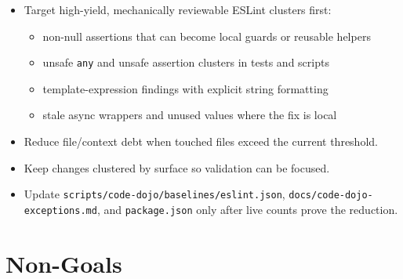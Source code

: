 \begin{itemize}
\tightlist
\item
  Target high-yield, mechanically reviewable ESLint clusters first:

  \begin{itemize}
  \tightlist
  \item
    non-null assertions that can become local guards or reusable helpers
  \item
    unsafe \texttt{a\allowbreak{}n\allowbreak{}y} and unsafe assertion clusters in tests and scripts
  \item
    template-expression findings with explicit string formatting
  \item
    stale async wrappers and unused values where the fix is local
  \end{itemize}
\item
  Reduce file/context debt when touched files exceed the current threshold.
\item
  Keep changes clustered by surface so validation can be focused.
\item
  Update \texttt{s\allowbreak{}c\allowbreak{}r\allowbreak{}i\allowbreak{}p\allowbreak{}t\allowbreak{}s\allowbreak{}/\allowbreak{}c\allowbreak{}o\allowbreak{}d\allowbreak{}e\allowbreak{}-\allowbreak{}d\allowbreak{}o\allowbreak{}j\allowbreak{}o\allowbreak{}/\allowbreak{}b\allowbreak{}a\allowbreak{}s\allowbreak{}e\allowbreak{}l\allowbreak{}i\allowbreak{}n\allowbreak{}e\allowbreak{}s\allowbreak{}/\allowbreak{}e\allowbreak{}s\allowbreak{}l\allowbreak{}i\allowbreak{}n\allowbreak{}t\allowbreak{}.\allowbreak{}j\allowbreak{}s\allowbreak{}o\allowbreak{}n}, \texttt{d\allowbreak{}o\allowbreak{}c\allowbreak{}s\allowbreak{}/\allowbreak{}c\allowbreak{}o\allowbreak{}d\allowbreak{}e\allowbreak{}-\allowbreak{}d\allowbreak{}o\allowbreak{}j\allowbreak{}o\allowbreak{}-\allowbreak{}e\allowbreak{}x\allowbreak{}c\allowbreak{}e\allowbreak{}p\allowbreak{}t\allowbreak{}i\allowbreak{}o\allowbreak{}n\allowbreak{}s\allowbreak{}.\allowbreak{}m\allowbreak{}d}, and \texttt{p\allowbreak{}a\allowbreak{}c\allowbreak{}k\allowbreak{}a\allowbreak{}g\allowbreak{}e\allowbreak{}.\allowbreak{}j\allowbreak{}s\allowbreak{}o\allowbreak{}n} only after live counts prove the reduction.
\end{itemize}

\section{Non-Goals}\label{record-217-non-goals}

